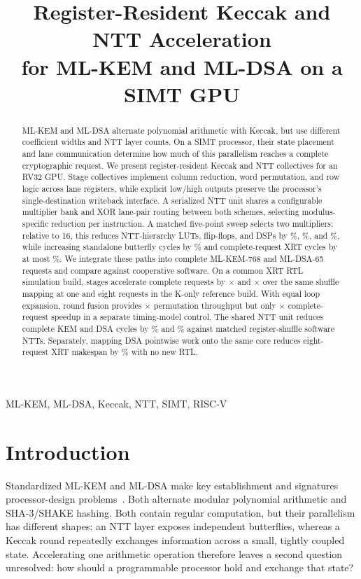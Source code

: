 \documentclass[conference,letterpaper]{IEEEtran}
\title{Register-Resident Keccak and NTT Acceleration\\for ML-KEM and ML-DSA on a SIMT GPU}
\author{\IEEEauthorblockN{Anonymous Authors}}
\begin{document}
\maketitle
\begin{abstract}
ML-KEM and ML-DSA alternate polynomial arithmetic with Keccak, but use
different coefficient widths and NTT layer counts. On a SIMT processor,
their state placement and lane communication determine how much of this
parallelism reaches a complete cryptographic request.
We present register-resident Keccak and NTT collectives for an RV32 GPU.
Stage collectives implement column reduction, word permutation, and row
logic across lane registers, while explicit low/high outputs preserve the
processor's single-destination writeback interface.
A serialized NTT unit shares a configurable multiplier bank and XOR lane-pair
routing between both schemes, selecting modulus-specific reduction per
instruction. A matched five-point sweep selects two multipliers: relative to
16, this reduces NTT-hierarchy LUTs, flip-flops, and DSPs by
\BankTwoNttLutSaved{}\%, \BankTwoNttFfSaved{}\%, and
\BankTwoNttDspSaved{}\%, while increasing standalone butterfly cycles by
\BankTwoNttPenalty{}\% and complete-request XRT cycles by at most
\BankTwoEndToEndMax{}\%.
We integrate these paths into complete ML-KEM-768 and ML-DSA-65 requests
and compare against cooperative software.
On a common XRT RTL simulation build, stages accelerate complete requests
by \StageVsShuffleOne{}$\times$ and \StageVsShuffleEight{}$\times$ over the
same shuffle mapping at one and eight requests in the K-only reference build.
With equal loop expansion, round fusion provides \FusionEight{}$\times$
permutation throughput but only \FusionKemEight{}$\times$ complete-request
speedup in a separate timing-model control.
The shared NTT unit reduces complete KEM and DSA cycles by
\KemNttSaved{}\% and \DsaNttSaved{}\% against matched register-shuffle
software NTTs. Separately, mapping DSA pointwise work onto the same core
reduces eight-request XRT makespan by \DsaPointwiseEightSaved{}\% with no new RTL.
\end{abstract}
\begin{IEEEkeywords}
ML-KEM, ML-DSA, Keccak, NTT, SIMT, RISC-V
\end{IEEEkeywords}

\section{Introduction}
Standardized ML-KEM and ML-DSA make key establishment and signatures
processor-design problems~\cite{fips203,fips204}. Both alternate modular
polynomial arithmetic and SHA-3/SHAKE hashing.
Both contain regular computation, but their parallelism has different
shapes: an NTT layer exposes independent butterflies, whereas a Keccak
round repeatedly exchanges information across a small, tightly coupled
state. Accelerating one arithmetic operation therefore leaves a second
question unresolved: how should a programmable processor hold and exchange
that state?
\end{document}
